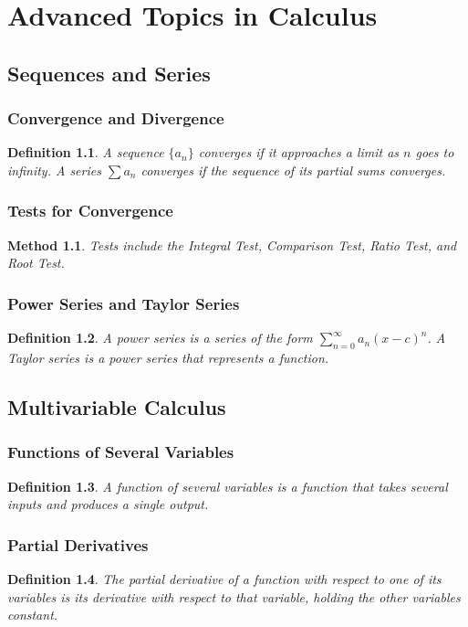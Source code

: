 \documentclass[a4paper,12pt]{book}
\newtheorem{definition}{Definition}
\newtheorem{method}{Method}
\begin{document}
\chapter{Advanced Topics in Calculus}
\section{Sequences and Series}
\subsection{Convergence and Divergence}
\begin{definition}
A sequence \( \{a_n\} \) converges if it approaches a limit as \( n \) goes to infinity. A series \( \sum a_n \) converges if the sequence of its partial sums converges.
\end{definition}

\subsection{Tests for Convergence}
\begin{method}
Tests include the Integral Test, Comparison Test, Ratio Test, and Root Test.
\end{method}

\subsection{Power Series and Taylor Series}
\begin{definition}
A power series is a series of the form \( \sum_{n=0}^\infty a_n (x - c)^n \). A Taylor series is a power series that represents a function.
\end{definition}

\section{Multivariable Calculus}
\subsection{Functions of Several Variables}
\begin{definition}
A function of several variables is a function that takes several inputs and produces a single output.
\end{definition}

\subsection{Partial Derivatives}
\begin{definition}
The partial derivative of a function with respect to one of its variables is its derivative with respect to that variable, holding the other variables constant.
\end{definition}
\end{document}
